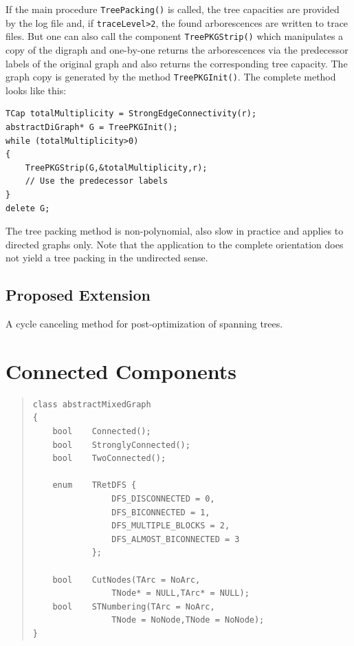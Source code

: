 \documentclass[a4paper,11pt,twoside]{book}
\begin{document}
\begin{multicols}{2}
If the main procedure \verb/TreePacking()/ is called, the tree capacities
are provided by the log file and, if \verb/traceLevel>2/, the found
arborescences are written to trace files. But one can also call the component
\verb/TreePKGStrip()/ which manipulates a copy of the digraph and
one-by-one returns the arborescences via the predecessor labels of the original
graph and also returns the corresponding tree capacity. The graph copy is
generated by the method \verb/TreePKGInit()/. The complete method looks like
this:
\begin{mysample}
\begin{verbatim}
TCap totalMultiplicity = StrongEdgeConnectivity(r);
abstractDiGraph* G = TreePKGInit();
while (totalMultiplicity>0)
{
    TreePKGStrip(G,&totalMultiplicity,r);
    // Use the predecessor labels
}
delete G;
\end{verbatim}
\end{mysample}
The tree packing method is non-polynomial, also slow in practice and applies to
directed graphs only. Note that the application to the complete orientation
does not yield a tree packing in the undirected sense.


\subsection{Proposed Extension}
A cycle canceling method for post-optimization of spanning trees.



\vfill
{}
\section{Connected Components}
\label{slb_components}
\methods
\begin{quote}
\begin{verbatim}
class abstractMixedGraph
{
    bool    Connected();
    bool    StronglyConnected();
    bool    TwoConnected();

    enum    TRetDFS {
                DFS_DISCONNECTED = 0,
                DFS_BICONNECTED = 1,
                DFS_MULTIPLE_BLOCKS = 2,
                DFS_ALMOST_BICONNECTED = 3
            };

    bool    CutNodes(TArc = NoArc,
                TNode* = NULL,TArc* = NULL);
    bool    STNumbering(TArc = NoArc,
                TNode = NoNode,TNode = NoNode);
}
\end{verbatim}
\end{quote}


\end{multicols}
\end{document}

